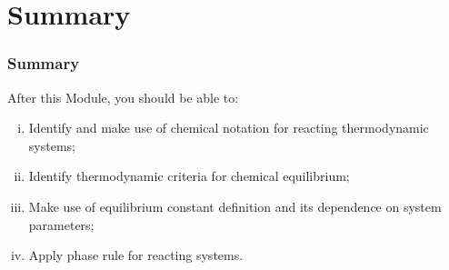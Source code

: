 \documentclass[10pt,compress,handout,unknownkeysallowed]{beamer}
\begin{document}
\section{Summary}

\begin{frame}
 \frametitle{Summary}
   After this Module, you should be able to:
   \begin{enumerate}[(i)]
     \item Identify and make use of chemical notation for reacting thermodynamic systems;
     \item Identify thermodynamic criteria for chemical equilibrium;
     \item Make use of equilibrium constant definition and its dependence on system parameters;
     \item Apply phase rule for reacting systems.
   \end{enumerate}
\end{frame}
\end{document}
